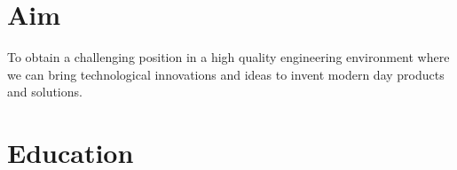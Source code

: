 \documentclass[11pt,a4paper,sans]{moderncv}        %
\begin{document}
\vspace*{-1.05mm}
\makecvtitle
\vspace*{-10mm}

\section{Aim}
To obtain a challenging position in a high quality engineering environment where we can bring technological innovations and ideas to invent modern day products and solutions.

\section{Education}




    


\end{document}
